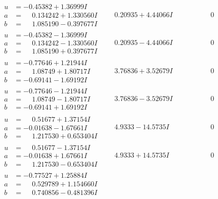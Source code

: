 \documentclass[1p]{elsarticle_modified}
\theoremstyle{definition}
\begin{document}
$$\begin{array}{c|c|c}
\begin{aligned}
u &= -0.45382 + 1.36999 I \\
a &= \phantom{-}0.134242 + 1.330560 I \\
b &= \phantom{-}1.085190 - 0.397677 I\end{aligned}
 & \phantom{-}0.20935 + 4.44066 I & \phantom{-0.000000 } 0 \\ \hline\begin{aligned}
u &= -0.45382 - 1.36999 I \\
a &= \phantom{-}0.134242 - 1.330560 I \\
b &= \phantom{-}1.085190 + 0.397677 I\end{aligned}
 & \phantom{-}0.20935 - 4.44066 I & \phantom{-0.000000 } 0 \\ \hline\begin{aligned}
u &= -0.77646 + 1.21944 I \\
a &= \phantom{-}1.08749 + 1.80717 I \\
b &= -0.69141 - 1.69192 I\end{aligned}
 & \phantom{-}3.76836 + 3.52679 I & \phantom{-0.000000 } 0 \\ \hline\begin{aligned}
u &= -0.77646 - 1.21944 I \\
a &= \phantom{-}1.08749 - 1.80717 I \\
b &= -0.69141 + 1.69192 I\end{aligned}
 & \phantom{-}3.76836 - 3.52679 I & \phantom{-0.000000 } 0 \\ \hline\begin{aligned}
u &= \phantom{-}0.51677 + 1.37154 I \\
a &= -0.01638 - 1.67661 I \\
b &= \phantom{-}1.217530 + 0.653404 I\end{aligned}
 & \phantom{-}4.9333 - 14.5735 I & \phantom{-0.000000 } 0 \\ \hline\begin{aligned}
u &= \phantom{-}0.51677 - 1.37154 I \\
a &= -0.01638 + 1.67661 I \\
b &= \phantom{-}1.217530 - 0.653404 I\end{aligned}
 & \phantom{-}4.9333 + 14.5735 I & \phantom{-0.000000 } 0 \\ \hline\begin{aligned}
u &= -0.77527 + 1.25884 I \\
a &= \phantom{-}0.529789 + 1.154660 I \\
b &= \phantom{-}0.740856 - 0.481396 I\end{aligned}

\end{array}$$
\end{document}
